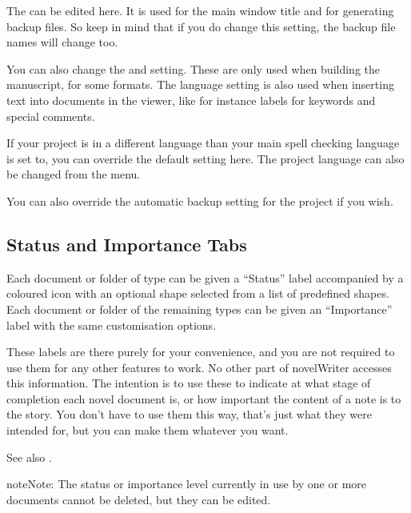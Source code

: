 \documentclass[a4paper,11pt,english]{sphinxmanual}
\begin{document}
\sphinxAtStartPar
The  can be edited here. It is used for the main window title and for generating
backup files. So keep in mind that if you do change this setting, the backup file names will change
too.

\sphinxAtStartPar
You can also change the  and  setting. These are only used when
building the manuscript, for some formats. The language setting is also used when inserting text
into documents in the viewer, like for instance labels for keywords and special comments.

\sphinxAtStartPar
If your project is in a different language than your main spell checking language is set to, you
can override the default setting here. The project language can also be changed from the 
menu.

\sphinxAtStartPar
You can also override the automatic backup setting for the project if you wish.


\subsection{Status and Importance Tabs}
\label{\detokenize{project_overview:status-and-importance-tabs}}
\sphinxAtStartPar
Each document or folder of type  can be given a “Status” label accompanied by a coloured
icon with an optional shape selected from a list of pre\sphinxhyphen{}defined shapes. Each document or folder of
the remaining types can be given an “Importance” label with the same customisation options.

\sphinxAtStartPar
These labels are there purely for your convenience, and you are not required to use them for any
other features to work. No other part of novelWriter accesses this information. The intention is to
use these to indicate at what stage of completion each novel document is, or how important the
content of a note is to the story. You don’t have to use them this way, that’s just what they were
intended for, but you can make them whatever you want.

\sphinxAtStartPar
See also {\hyperref[\detokenize{usage_project:a-ui-tree-status}]{}}.

\begin{sphinxadmonition}{note}{Note:}
\sphinxAtStartPar
The status or importance level currently in use by one or more documents cannot be deleted, but
they can be edited.
\end{sphinxadmonition}
\end{document}
